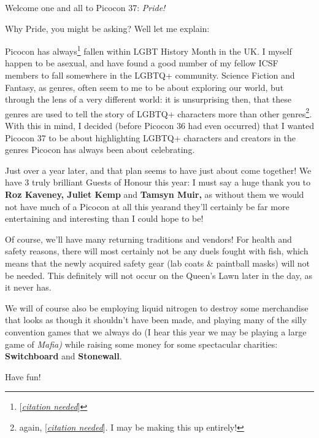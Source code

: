 ﻿Welcome one and all to Picocon 37: \emph{Pride!}

Why Pride, you might be asking? Well let me explain:

Picocon has always\footnote{
  [\underline{\textit{citation needed}}]
}
fallen within LGBT History Month in the UK. I myself happen to be
asexual, and have found a good number of my fellow ICSF members to
fall somewhere in the LGBTQ+ community. Science Fiction and Fantasy,
as genres, often seem to me to be about exploring our world, but
through the lens of a very different world: it is unsurprising then,
that these genres are used to tell the story of LGBTQ+ characters
more than other genres\footnote{
again, [\underline{{\textit{citation needed}}}]. I may be making this
up entirely!  
}. With this in mind, I decided (before Picocon 36 had
even occurred) that I wanted Picocon 37 to be about highlighting
LGBTQ+ characters and creators in the genres Picocon has always been
about celebrating.

Just over a year later, and that plan seems to have just about come
together! We have 3 truly brilliant Guests of Honour this year: I must
say a huge thank you to \textbf{Roz Kaveney, Juliet Kemp} and
\textbf{Tamsyn Muir,} as without them we would not have much of a
Picocon at all this year\textemdash and they'll certainly be far more
entertaining and interesting than I could hope to be!

Of course, we'll have many returning traditions and vendors! For
health and safety reasons, there will most certainly not be any duels
fought with fish, which means that the newly acquired safety gear (lab
coats \& paintball masks) will not be needed. This definitely will not
occur on the Queen's Lawn later in the day, as it never has.

We will of course also be employing liquid nitrogen to destroy some
merchandise that looks as though it shouldn't have been made, and
playing many of the silly convention games that we always do (I hear
this year we may be playing a large game of \emph{Mafia)} while
raising some money for some spectacular charities:
\textbf{Switchboard} and \textbf{Stonewall}.

Have fun!
